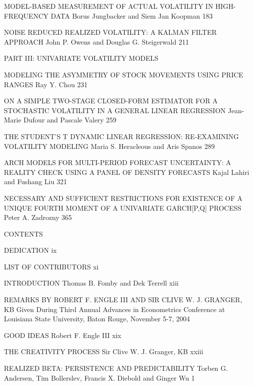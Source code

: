 MODEL-BASED MEASUREMENT OF ACTUAL VOLATILITY IN HIGH-FREQUENCY DATA
Borus Jungbacker and Siem Jan Koopman 183



NOISE REDUCED REALIZED VOLATILITY: A KALMAN FILTER APPROACH
John P. Owens and Douglas G. Steigerwald 211



PART III: UNIVARIATE VOLATILITY MODELS



MODELING THE ASYMMETRY OF STOCK MOVEMENTS USING PRICE RANGES
Ray Y. Chou 231



ON A SIMPLE TWO-STAGE CLOSED-FORM ESTIMATOR FOR A STOCHASTIC VOLATILITY IN A GENERAL LINEAR REGRESSION
Jean-Marie Dufour and Pascale Valery 259



THE STUDENT'S T DYNAMIC LINEAR REGRESSION: RE-EXAMINING VOLATILITY MODELING
Maria S. Heracleous and Aris Spanos 289



ARCH MODELS FOR MULTI-PERIOD FORECAST UNCERTAINTY: A REALITY CHECK USING A PANEL OF DENSITY FORECASTS
Kajal Lahiri and Fushang Liu 321



NECESSARY AND SUFFICIENT RESTRICTIONS FOR EXISTENCE OF A UNIQUE FOURTH MOMENT OF A UNIVARIATE GARCH[P,Q] PROCESS
Peter A. Zadrozny 365



CONTENTS



DEDICATION ix



LIST OF CONTRIBUTORS xi



INTRODUCTION
Thomas B. Fomby and Dek Terrell xiii



REMARKS BY ROBERT F. ENGLE III AND SIR CLIVE W. J. GRANGER, KB
Given During Third Annual Advances in Econometrics Conference at Louisiana State University, Baton Rouge, November 5-7, 2004



GOOD IDEAS
Robert F. Engle III xix



THE CREATIVITY PROCESS
Sir Clive W. J. Granger, KB xxiii



REALIZED BETA: PERSISTENCE AND PREDICTABILITY
Torben G. Andersen, Tim Bollerslev, Francis X. Diebold and Ginger Wu 1




